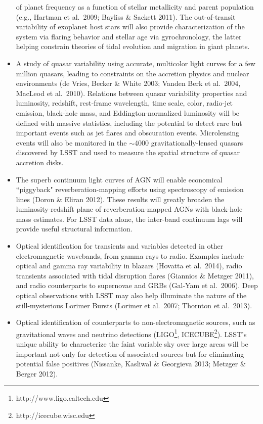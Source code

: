 \documentclass{emulateapj}
\begin{document}
\begin{itemize}
of planet frequency as a function of stellar metallicity and parent population (e.g., Hartman et al.~2009; Bayliss \& 
Sackett 2011). The out-of-transit variability of exoplanet host stars will also provide characterization of the system 
via flaring behavior and stellar age via gyrochronology, the latter helping constrain theories of tidal evolution and 
migration in giant planets. 
\item A study of quasar variability using accurate, multicolor light
  curves for a few million  
quasars, leading to constraints on the accretion physics and nuclear environments (de Vries, Becker 
\& White 2003; Vanden Berk et al.~2004, MacLeod et al.~2010). Relations between quasar variability 
      properties and luminosity, redshift, 
      rest-frame wavelength, time scale, color, radio-jet emission, black-hole 
      mass, and Eddington-normalized luminosity will be defined with massive
      statistics, including the potential to detect rare but important events such as 
      jet flares and obscuration events. Microlensing events will also be monitored in the $\sim$4000 gravitationally-lensed 
      quasars discovered by LSST and used to measure the spatial structure of quasar accretion disks.
\item The superb continuum light curves of AGN will enable economical ``piggyback" 
      reverberation-mapping efforts using spectroscopy of emission lines (Doron \& Eliran 2012). These results 
      will greatly broaden the luminosity-redshift plane of reverberation-mapped AGNs
      with black-hole mass estimates. For LSST data alone, the inter-band continuum lags 
      will provide useful structural information. 
\item Optical identification for transients and variables detected in other electromagnetic wavebands, 
from gamma rays to radio. Examples include optical and gamma ray variability in blazars (Hovatta et al.~2014), 
radio transients associated with tidal disruption flares (Giannios \& Metzger 2011), and radio counterparts to 
supernovae and GRBs (Gal-Yam et al.~2006). Deep optical observations with LSST may also help illuminate the 
nature of the still-mysterious Lorimer Bursts (Lorimer et al.~2007; Thornton et al.~2013).
\item Optical identification of counterparts to non-electromagnetic sources, such as gravitational waves and
neutrino detections (LIGO\footnote{http://www.ligo.caltech.edu}, ICECUBE\footnote{http://icecube.wisc.edu}). 
LSST's unique ability to characterize the faint variable sky over large areas will be important not only for detection 
of associated sources but for eliminating potential false positives (Nissanke, Kasliwal \& Georgieva 2013; 
Metzger \& Berger 2012).  
\end{itemize}
\end{document}
